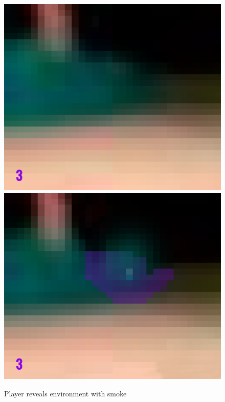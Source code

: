 \begin{figure}[p]
  \centering
  \includegraphics[width=\imgWidth]{images/game_systems/NoSmoke.png} \\[\picVdist]
  \includegraphics[width=\imgWidth]{images/game_systems/ThrowSmoke.png}
  \caption{Player reveals environment with smoke}
  \label{SmokeInEnvironment}
\end{figure}

